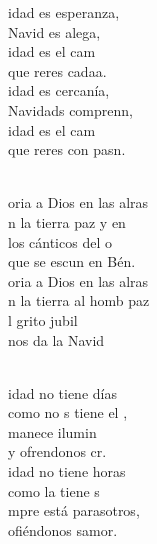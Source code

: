 \documentclass[12pt]{article}
\begin{document}
\begin{multicols*}{2}
\begin{cancion}%
	idad es esperanza, \\
	Navid es alega,\\
	idad es el cam \\
	que reres cadaa. \\
	idad es cercanía, \\
	Navidads comprenn, \\
	idad es el cam \\
	que reres con pasn. \\\jump\\
	\begin{chorus}%
	oria a Dios en las alras\\
	n la tierra paz y en\\
	los cánticos del o\\
	que se escun en Bén.\\
	oria a Dios en las alras\\
	n la tierra al homb paz\\
	l grito jubil\\
	 nos da la Navid\\
	\end{chorus}%
	\jump\\
	idad no tiene días \\
	como no s tiene el ,\\
	manece ilumin \\
	y ofrendonos cr. \\
	idad no tiene horas\\
	como  la tiene s\\
	mpre está parasotros,\\
	ofiéndonos samor.\\
\end{cancion}%


\end{multicols*}
\end{document}
